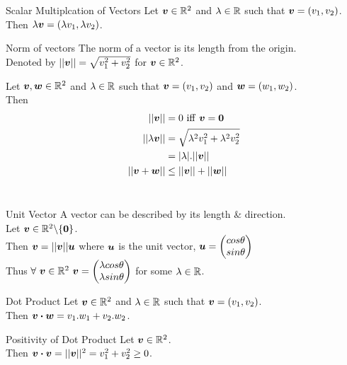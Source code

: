 \documentclass[11pt,a4paper]{article}
\begin{document}
\subtitle{Definition 1.03 - }{Scalar Multiplcation of Vectors}
Let $\boldsymbol{v} \in \mathbb{R}^2$ and $\lambda \in \mathbb{R}$ such that $\boldsymbol{v} = (v_1,v_2)$. \\
Then $\lambda\boldsymbol{v} = (\lambda v_1, \lambda v_2)$. \\

\subtitle{Definition 1.04 - }{Norm of vectors}
The norm of a vector is its length from the origin. \\
Denoted by $||\boldsymbol{v}|| = \sqrt{v_{1}^{2} + v_{2}^{2}}$ for $\boldsymbol{v} \in \mathbb{R}^2$. \\

\subtitle{Theorem 1.05}{}
Let $\boldsymbol{v}, \boldsymbol{w} \in \mathbb{R}^2$ and $\lambda \in \mathbb{R} $ such that $\boldsymbol{v} = (v_1,v_2)$ and $\boldsymbol{w} = (w_1,w_2)$. \\
Then
\begin{align*}
  ||\boldsymbol{v}|| &= 0\ \mathrm{iff}\ \boldsymbol{v} = \boldsymbol{0}\\
  ||\lambda\boldsymbol{v}|| &= \sqrt{\lambda^2v_{1}^{2} + \lambda^2v_{2}^{2}} \\
  &= |\lambda|.||\boldsymbol{v}|| \\
  ||\boldsymbol{v} + \boldsymbol{w}|| &\leq ||\boldsymbol{v}|| + ||\boldsymbol{w}||
\end{align*} \\

\subtitle{Definition 1.06 - }{Unit Vector}
A vector can be described by its length \& direction. \\
Let $\boldsymbol{v} \in \mathbb{R}^2\backslash\{\boldsymbol{0}\}$. \\
Then $\boldsymbol{v} = ||\boldsymbol{v}||\boldsymbol{u}$ where $\boldsymbol{u}$ is the unit vector, $\boldsymbol{u} = \begin{pmatrix} cos\theta \\ sin\theta \end{pmatrix}$ \\
Thus $\forall\ \boldsymbol{v} \in \mathbb{R}^2\ \boldsymbol{v} = \begin{pmatrix} \lambda cos\theta \\ \lambda sin\theta \end{pmatrix}$ for some $\lambda \in \mathbb{R}$. \\

\subtitle{Definition 1.07 - }{Dot Product}
Let $\boldsymbol{v} \in \mathbb{R}^2$ and $\lambda \in \mathbb{R}$ such that $\boldsymbol{v} = (v_1,v_2)$. \\
Then $\boldsymbol{v} \boldsymbol{\cdot} \boldsymbol{w} = v_1.w_1 + v_2.w_2$. \\

\subtitle{Remark 1.08 - }{Positivity of Dot Product}
Let $\boldsymbol{v} \in \mathbb{R}^2$. \\
Then $\boldsymbol{v} \boldsymbol{\cdot} \boldsymbol{v} = ||\boldsymbol{v}||^2 = v_{1}^{2} + v_{2}^{2} \geq 0$. \\
\end{document}
